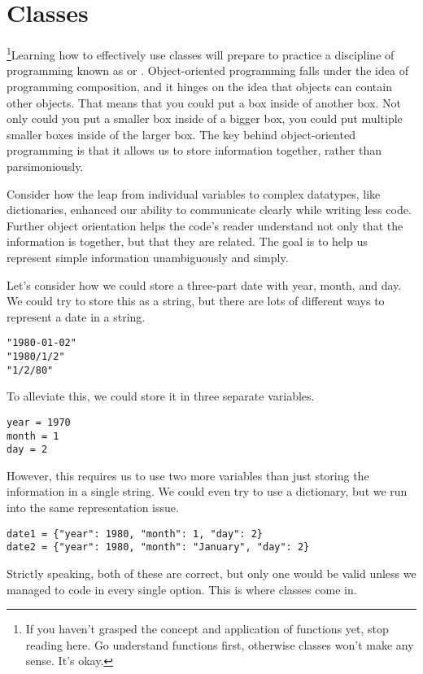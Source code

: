 \section{Classes}
\footnote{If you haven't grasped the concept and application of functions yet, stop reading here. Go understand functions first, otherwise classes won't make any sense. It's okay.}Learning how to effectively use classes will prepare to practice a discipline of programming known as  or . Object-oriented programming falls under the idea of programming composition, and it hinges on the idea that objects can contain other objects. That means that you could put a box inside of another box. Not only could you put a smaller box inside of a bigger box, you could put multiple smaller boxes inside of the larger box. The key behind object-oriented programming is that it allows us to store information together, rather than parsimoniously.\par
Consider how the leap from individual variables to complex datatypes, like dictionaries, enhanced our ability to communicate clearly while writing less code. Further object orientation helps the code's reader understand not only that the information is together, but that they are related. The goal is to help us represent simple information unambiguously and simply.\par
Let's consider how we could store a three-part date with year, month, and day. We could try to store this as a string, but there are lots of different ways to represent a date in a string.
\begin{lstlisting}[style=pippython]
"1980-01-02"
"1980/1/2"
"1/2/80"
\end{lstlisting}
To alleviate this, we could store it in three separate variables.
\begin{lstlisting}[style=pippython]
year = 1970
month = 1
day = 2
\end{lstlisting}
However, this requires us to use two more variables than just storing the information in a single string. We could even try to use a dictionary, but we run into the same representation issue.
\begin{lstlisting}[style=pippython]
date1 = {"year": 1980, "month": 1, "day": 2}
date2 = {"year": 1980, "month": "January", "day": 2}
\end{lstlisting}
Strictly speaking, both of these are correct, but only one would be valid unless we managed to code in every single option. This is where classes come in.
